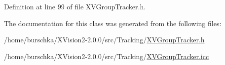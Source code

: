 Definition at line 99 of file XVGroup\-Tracker.h.

The documentation for this class was generated from the following files:\begin{CompactItemize}
\item 
/home/burschka/XVision2-2.0.0/src/Tracking/\hyperlink{XVGroupTracker.h-source}{XVGroup\-Tracker.h}\item 
/home/burschka/XVision2-2.0.0/src/Tracking/\hyperlink{XVGroupTracker.icc-source}{XVGroup\-Tracker.icc}\end{CompactItemize}
